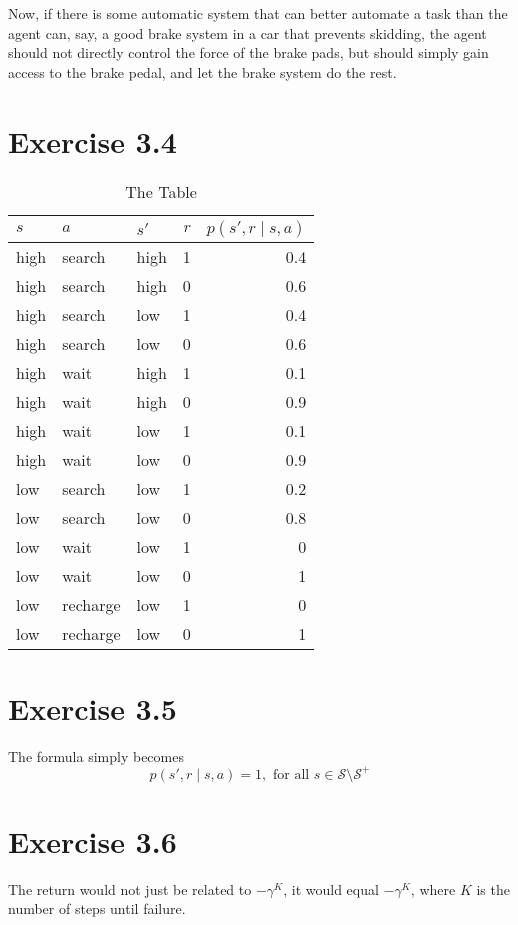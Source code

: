 \documentclass[a4paper,11pt,reqno]{amsart}
\begin{document}
Now, if there is some automatic system that can better automate a task than the agent can, say, a good brake system in a car that prevents skidding, the agent should not directly control the force of the brake pads, but should simply gain access to the brake pedal, and let the brake system do the rest.

\section*{Exercise 3.4}

\begin{table}[H]
    \centering
    \caption{The Table}

    \begin{tabular}{l|l|l|r|r}
        \(s\)  & \(a\)  & \(s'\)  & \(r\)  & \(p(s', r \mid s, a )\)  \\
        \hline
         high&  search& high & 1 & 0.4  \\
         high&  search& high & 0 & 0.6 \\
         high&  search& low  & 1 & 0.4 \\
         high&  search& low  & 0 & 0.6  \\
         high&  wait  & high & 1 & 0.1 \\
         high&  wait  & high & 0 & 0.9 \\
         high&  wait  & low  & 1 & 0.1 \\
         high&  wait  & low  & 0 & 0.9  \\
         low &  search& low  & 1 & 0.2 \\
         low &  search& low  & 0 & 0.8 \\
         low &  wait  & low  & 1 & 0 \\
         low &  wait  & low  & 0 & 1 \\
         low &  recharge& low & 1 & 0 \\
         low &  recharge& low & 0 & 1 
    \end{tabular}
\end{table}

\section*{Exercise 3.5}
The formula simply becomes
\[
    p(s', r \mid s, a) = 1, \text{ for all } s \in \mathcal{S} \setminus \mathcal{S}^{+}
\]

\section*{Exercise 3.6}
The return would not just be related to $-\gamma^{K}$, it would equal $-\gamma^{K}$, where $K$ is the number of steps until failure.
\end{document}
